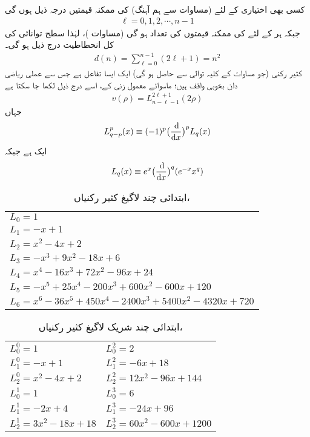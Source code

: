  کسی بھی اختیاری  کے لئے (مساوات  سے ہم آہنگ)  کی ممکنہ قیمتیں درجہ ذیل ہوں گی
\begin{align}
\ell=0,1,2,\cdots, n-1 
\end{align}
جبکہ ہر  کے لئے  کی ممکنہ قیمتوں کی تعداد  ہو گی (مساوات )، لہٰذا  سطح توانائی کی کل انحطاطیت درج ذیل ہو گی۔ 
\begin{align}
d(n)=\sum_{\ell=0}^{n-1}(2\ell+1)=n^{2} 
\end{align}
کثیر رکنی  (جو مساوات  کے کلیہ توالی سے حاصل ہو گی) ایک ایسا تفاعل ہے جس سے عملی ریاضی دان بخوبی واقف ہیں؛ ماسوائے معمول زنی کے، اسے درج ذیل لکھا جا سکتا ہے
 \begin{align}\label{مساوات_تین_ابعادی_لاگیغ_الف}
v(\rho)=L_{n-\ell-1}^{2\ell+1}(2\rho) 
\end{align}
 جہاں
 \begin{align}\label{مساوات_تین_ابعادی_لاگیغ_ب}
L_{q-p}^{p}(x)\equiv(-1)^{p}\big(\frac{\dif}{\dif{x}}\big)^{p}L_{q}(x) 
\end{align} 
 ایک  ہے جبکہ 
\begin{align}\label{مساوات_تین_ابعادی_لاگیغ_پ}
 L_{q}(x)\equiv e^{x}\big(\frac{\dif}{\dif{x}}\big)^{q}(e^{-x}x^{q}) 
\end{align}
\begin{table}
\caption{ابتدائی چند لاگیغ کثیر رکنیاں، }
\label{جدول_ابعاد_لاگیغ_ابتدائی_چند}
\centering
\renewcommand{\arraystretch}{1.25}
\begin{tabular}{l}
\toprule
$L_0=1$\\
$L_1=-x+1$\\
$L_2=x^2-4x+2$\\
$L_3=-x^3+9x^2-18x+6$\\
$L_4=x^4-16x^3+72x^2-96x+24$\\
$L_5=-x^5+25x^4-200x^3+600x^2-600x+120$\\
$L_6=x^6-36x^5+450x^4-2400x^3+5400x^2-4320x+720$\\
\bottomrule
\end{tabular}
\end{table}
\begin{table}
\caption{ابتدائی چند شریک لاگیغ کثیر رکنیاں، }
\label{جدول_ابعادی_شریک_لاگیغ_کثیر_رکنیاں}
\centering
\renewcommand{\arraystretch}{1.25}
\begin{tabular}{ll}
\toprule
$L_0^0=1$ & $L_0^2=2$\\
$L_1^0=-x+1$ & $L_1^2=-6x+18$\\
$L_2^0=x^2-4x+2$ & $L_2^2=12x^2-96x+144$\\
$L_0^1=1$ & $L_0^3=6$\\
$L_1^1=-2x+4$ & $L_1^3=-24x+96$\\
$L_2^1=3x^2-18x+18$ & $L_2^3=60x^2-600x+1200$\\
\bottomrule
\end{tabular}
\end{table}
